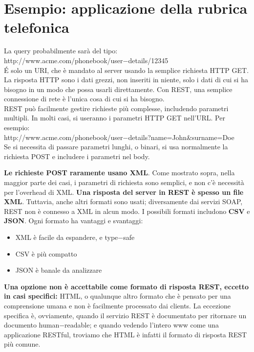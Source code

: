 \section{Esempio: applicazione della rubrica telefonica}
La query probabilmente sarà del tipo:\\

http://www.acme.com/phonebook/user$-$details/12345\\

\'E solo un URI, che è mandato al server usando la semplice richiesta HTTP GET. La risposta HTTP sono i dati grezzi, non inseriti in niente, solo i dati di cui si ha bisogno in un modo che possa usarli direttamente.
Con REST, una semplice connessione di rete è l'unica cosa di cui si ha bisogno. \\

REST può facilmente gestire richieste più complesse, includendo parametri multipli. In molti casi, si useranno i parametri HTTP GET nell'URL. Per esempio:\\

http://www.acme.com/phonebook/user$-$details?name=John\&surname=Doe\\

Se si necessita di passare parametri lunghi, o binari, si usa normalmente la richiesta POST e includere i parametri nel body. 
    
\textbf{Le richieste POST raramente usano XML}. Come mostrato sopra, nella maggior parte dei casi, i parametri di richiesta sono semplici, e non c'è necessità per l'overhead di XML. \textbf{Una risposta del server in REST è spesso un file XML}. Tuttavia, anche altri formati sono usati; diversamente dai servizi SOAP, REST non è connesso a XML in alcun modo. I possibili formati includono \textbf{CSV} e \textbf{JSON}. Ogni formato ha vantaggi e svantaggi:
\begin{itemize}
    \item XML è facile da espandere, e type$-$safe
    \item CSV è più compatto
    \item JSON è banale da analizzare
\end{itemize}

\textbf{Una opzione non è accettabile come formato di risposta REST, eccetto in casi specifici:}
HTML, o qualunque altro formato che è pensato per una comprensione umana e non è facilmente processato dai clients. La eccezione specifica è, ovviamente, quando il servizio REST è documentato per ritornare un documento human$-$readable; e quando vedendo l'intero www come una applicazione RESTful, troviamo che HTML è infatti il formato di risposta REST più comune. 

